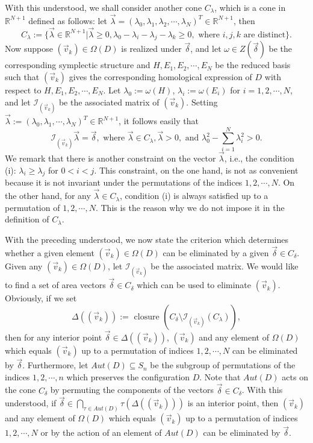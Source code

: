 \documentclass[11pt]{amsart}
\theoremstyle{plain}
\numberwithin{theorem}{section}
\theoremstyle{definition}
\newcommand{\R}{{\mathbb R}}
\newcommand{\I}{{\mathcal I}}
\begin{document}
With this understood, we shall consider another cone $C_{\lambda}$, which is a cone in $\R^{N+1}$ defined as follows: let $\vec{\lambda}=(\lambda_0,\lambda_1,\lambda_2,\cdots,\lambda_N)^T\in \R^{N+1}$, then
$$
C_{\lambda}:=\{\vec{\lambda}\in \R^{N+1}| \vec{\lambda}\geq 0, \lambda_0-\lambda_i-\lambda_j-\lambda_k\geq 0,  \mbox{ where $i,j,k$ are distinct}\}.
$$
Now suppose $(\vec{v}_k)\in\Omega(D)$ is realized under $\vec{\delta}$, and let $\omega\in Z(\vec{\delta})$ be
the corresponding symplectic structure and $H,E_1,E_2,\cdots,E_N$ be the reduced basis such that $(\vec{v}_k)$
gives the corresponding homological expression of $D$ with respect to $H,E_1,E_2,\cdots,E_N$. 
Let $\lambda_0:=\omega(H)$, $\lambda_i:=\omega(E_i)$ for $i=1,2,\cdots,N$, and let $\I_{(\vec{v}_k)}$ be the associated matrix of $(\vec{v}_k)$. Setting $\vec{\lambda}:=(\lambda_0,\lambda_1,\cdots,\lambda_N)^T\in \R^{N+1}$, it follows easily that 
$$
\I_{(\vec{v}_k)}\vec{\lambda}=\vec{\delta}, \mbox{ where } 
\vec{\lambda}\in C_\lambda, \vec{\lambda}>0, \mbox{ and } \lambda_0^2-\sum_{i=1}^N \lambda_i^2>0.
$$
We remark that there is another constraint on the vector $\vec{\lambda}$, i.e., the condition (i): 
$\lambda_i\geq \lambda_j$ for $0<i<j$. This constraint, on the one hand, is not as convenient 
because it is not invariant under the permutations of the indices $1,2, \cdots,N$. On the other hand,
for any $\vec{\lambda}\in C_\lambda$, condition (i) is always satisfied up to a permutation of 
$1,2, \cdots,N$. This is the reason why we do not impose it in the definition of $C_\lambda$. 

With the preceding understood, we now state the criterion which determines whether a given element 
$(\vec{v}_k)\in \Omega(D)$ can be eliminated by a given $\vec{\delta}\in C_\delta$. 
Given any $(\vec{v}_k)\in\Omega(D)$, let $\I_{(\vec{v}_k)}$ be the associated matrix. We would like to find a set of area vectors $\vec{\delta}\in C_\delta$ which can be used to eliminate $(\vec{v}_k)$. Obviously, if we set 
$$\Delta((\vec{v}_k)):=\text{ closure }(C_\delta\setminus \I_{(\vec{v}_k)}(C_\lambda)),$$ 
then for any interior point $\vec{\delta}\in \Delta((\vec{v}_k))$,
$(\vec{v}_k)$ and any element of $\Omega(D)$ which equals $(\vec{v}_k)$ up to a permutation of indices 
$1,2, \cdots,N$ can be eliminated by $\vec{\delta}$. Furthermore, let $Aut(D)\subseteq S_n$ be the subgroup of 
permutations of the indices $1,2,\cdots,n$ which preserves the configuration $D$. Note that 
$Aut(D)$ acts on the cone $C_\delta$ by permuting the components of the vectors $\vec{\delta}\in C_\delta$. 
With this understood, if $\vec{\delta}\in \bigcap_{\tau\in Aut(D)} \tau(\Delta((\vec{v}_k)))$ is an interior point, then
$(\vec{v}_k)$ and any element of $\Omega(D)$ which equals $(\vec{v}_k)$ up to a permutation of indices 
$1,2, \cdots,N$ or by the action of an element of $Aut(D)$ can be eliminated by $\vec{\delta}$. 
\end{document}
